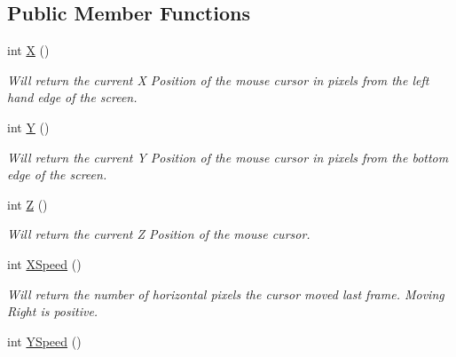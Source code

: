 \subsection*{Public Member Functions}
\begin{DoxyCompactItemize}
\item 
\hypertarget{classc_mouse_a4c39f6fc4be0cce7d3347a5d176e14c5}{
int \hyperlink{classc_mouse_a4c39f6fc4be0cce7d3347a5d176e14c5}{X} ()}
\label{classc_mouse_a4c39f6fc4be0cce7d3347a5d176e14c5}

\begin{DoxyCompactList}\small\item\em Will return the current X Position of the mouse cursor in pixels from the left hand edge of the screen. \end{DoxyCompactList}\item 
\hypertarget{classc_mouse_a58175245ddfa05f779ff6b01be8559b4}{
int \hyperlink{classc_mouse_a58175245ddfa05f779ff6b01be8559b4}{Y} ()}
\label{classc_mouse_a58175245ddfa05f779ff6b01be8559b4}

\begin{DoxyCompactList}\small\item\em Will return the current Y Position of the mouse cursor in pixels from the bottom edge of the screen. \end{DoxyCompactList}\item 
\hypertarget{classc_mouse_ac4723c282e2e7226230a87e06785d10b}{
int \hyperlink{classc_mouse_ac4723c282e2e7226230a87e06785d10b}{Z} ()}
\label{classc_mouse_ac4723c282e2e7226230a87e06785d10b}

\begin{DoxyCompactList}\small\item\em Will return the current Z Position of the mouse cursor. \end{DoxyCompactList}\item 
\hypertarget{classc_mouse_a2d60319fb5361eab17e50434397458c6}{
int \hyperlink{classc_mouse_a2d60319fb5361eab17e50434397458c6}{XSpeed} ()}
\label{classc_mouse_a2d60319fb5361eab17e50434397458c6}

\begin{DoxyCompactList}\small\item\em Will return the number of horizontal pixels the cursor moved last frame. Moving Right is positive. \end{DoxyCompactList}\item 
\hypertarget{classc_mouse_a32d613880fee10cf47e4245b8627b6de}{
int \hyperlink{classc_mouse_a32d613880fee10cf47e4245b8627b6de}{YSpeed} ()}
\label{classc_mouse_a32d613880fee10cf47e4245b8627b6de}


\end{DoxyCompactItemize}
